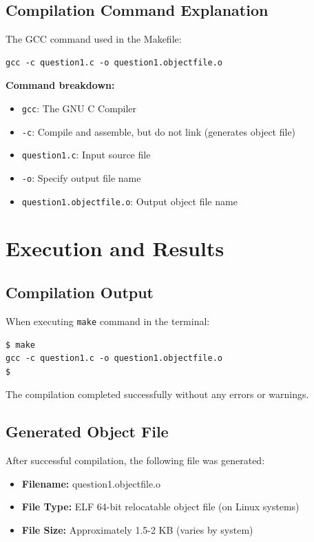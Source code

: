 \documentclass[12pt,a4paper]{article}
\begin{document}
\subsection{Compilation Command Explanation}
The GCC command used in the Makefile:
\begin{verbatim}
gcc -c question1.c -o question1.objectfile.o
\end{verbatim}

\textbf{Command breakdown:}
\begin{itemize}
    \item \texttt{gcc}: The GNU C Compiler
    \item \texttt{-c}: Compile and assemble, but do not link (generates object file)
    \item \texttt{question1.c}: Input source file
    \item \texttt{-o}: Specify output file name
    \item \texttt{question1.objectfile.o}: Output object file name
\end{itemize}

\section{Execution and Results}

\subsection{Compilation Output}
When executing \texttt{make} command in the terminal:
\begin{verbatim}
$ make
gcc -c question1.c -o question1.objectfile.o
$
\end{verbatim}

The compilation completed successfully without any errors or warnings.

\subsection{Generated Object File}
After successful compilation, the following file was generated:
\begin{itemize}
    \item \textbf{Filename:} question1.objectfile.o
    \item \textbf{File Type:} ELF 64-bit relocatable object file (on Linux systems)
    \item \textbf{File Size:} Approximately 1.5-2 KB (varies by system)
\end{itemize}
\end{document}
